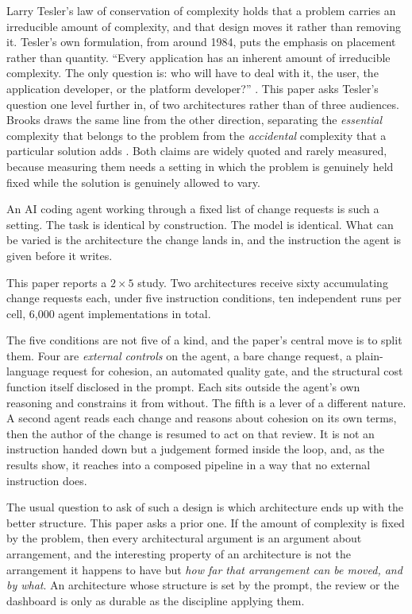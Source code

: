\documentclass[11pt,a4paper]{article}
\begin{document}
Larry Tesler's law of conservation of complexity holds that a problem carries
an irreducible amount of complexity, and that design moves it rather than
removing it. Tesler's own formulation, from around 1984, puts the emphasis on
placement rather than quantity. ``Every application has an inherent amount of
irreducible complexity. The only question is: who will have to deal with it,
the user, the application developer, or the platform developer?''
\cite{tesler1984, norman2010}. This paper asks Tesler's question one level
further in, of two architectures rather than of three audiences. Brooks draws
the same line from the other
direction, separating the \emph{essential} complexity that belongs to the
problem from the \emph{accidental} complexity that a particular solution adds
\cite{brooks1987}. Both claims are widely quoted and rarely measured, because
measuring them needs a setting in which the problem is genuinely held fixed
while the solution is genuinely allowed to vary.

An AI coding agent working through a fixed list of change requests is such a
setting. The task is identical by construction. The model is identical. What
can be varied is the architecture the change lands in, and the instruction the
agent is given before it writes.

This paper reports a $2 \times 5$ study. Two architectures receive sixty
accumulating change requests each, under five instruction conditions, ten
independent runs per cell, 6{,}000 agent implementations in total.

The five conditions are not five of a kind, and the paper's central move is to
split them. Four are \emph{external controls} on the agent, a bare change
request, a plain-language request for cohesion, an automated quality gate, and
the structural cost function itself disclosed in the prompt. Each sits outside
the agent's own reasoning and constrains it from without. The fifth is a lever
of a different nature. A second agent reads each change and reasons about
cohesion on its own terms, then the author of the change is resumed to act on
that review. It is not an instruction handed down but a judgement formed inside
the loop, and, as the results show, it reaches into a composed pipeline in a way
that no external instruction does.

The usual question to ask of such a design is which architecture ends up with
the better structure. This paper asks a prior one. If the amount of complexity
is fixed by the problem, then every architectural argument is an argument about
arrangement, and the interesting property of an architecture is not the
arrangement it happens to have but \emph{how far that arrangement can be moved,
and by what}. An architecture whose structure is set by the prompt, the review
or the dashboard is only as durable as the discipline applying them.
\end{document}
